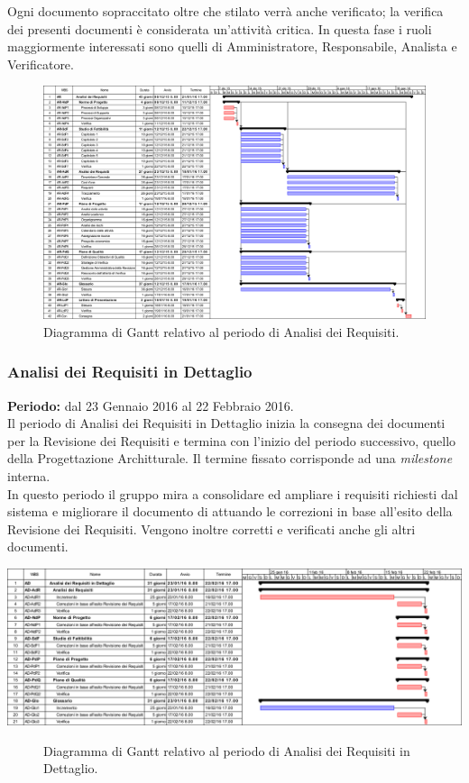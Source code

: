 Ogni documento sopraccitato oltre che stilato verrà anche verificato; la verifica dei presenti documenti è considerata un'attività critica.
In questa fase i ruoli maggiormente interessati sono quelli di Amministratore, Responsabile, Analista e Verificatore. 
\begin{figure}
	\centering
	\includegraphics[keepaspectratio = true, width=23cm]{immagini/PdP_AnalisiDeiRequisitiGantt.png}
	\caption{Diagramma di Gantt relativo al periodo di Analisi dei Requisiti.}\label{etichetta}
\end{figure}
\newpage

\subsubsection{Analisi dei Requisiti in Dettaglio}
\textbf{Periodo:} dal 23 Gennaio 2016 al 22 Febbraio 2016. \\
Il periodo di Analisi dei Requisiti in Dettaglio inizia la consegna dei documenti per la Revisione dei Requisiti e termina con l'inizio del periodo successivo, quello della Progettazione Architturale. Il termine fissato corrisponde ad una \textit{milestone} interna. \\
In questo periodo il gruppo mira a consolidare ed ampliare i requisiti richiesti dal sistema e migliorare il documento di \AdR attuando le correzioni in base all'esito della Revisione dei Requisiti.
Vengono inoltre corretti e verificati anche gli altri documenti. 
 
\begin{center}
	\includegraphics[keepaspectratio = true, width=16cm]{immagini/PdP_AnalisiDeiRequisitiInDettaglioGantt.png}
\end{center}
\begin{figure}[h]
	\caption{Diagramma di Gantt relativo al periodo di Analisi dei Requisiti in Dettaglio.}\label{etichetta}
\end{figure}

